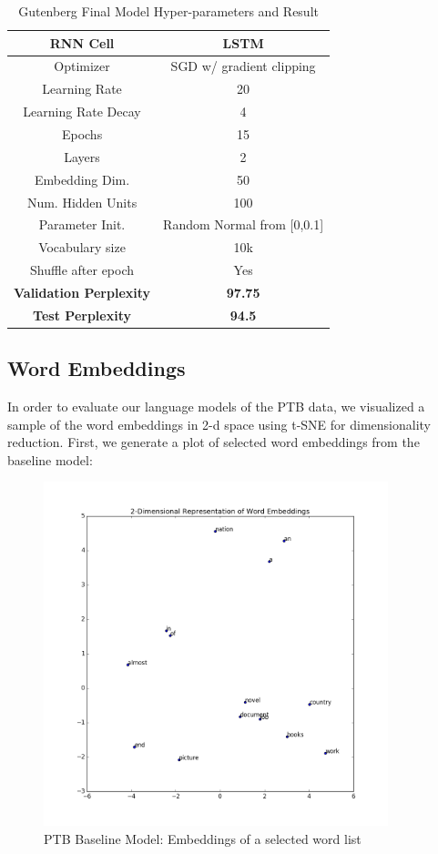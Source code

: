 \documentclass[a4paper]{article}
\begin{document}
\begin{table}[H]
\centering
\begin{tabular}{|c | c|} 
 \hline
RNN Cell & LSTM\\ \hline
Optimizer & SGD w/ gradient clipping \\ \hline
Learning Rate & 20 \\ \hline
Learning Rate Decay & 4 \\ \hline
Epochs & 15\\ \hline
Layers & 2\\ \hline
Embedding Dim. & 50\\ \hline
Num. Hidden Units & 100\\ \hline
Parameter Init. & Random Normal from [0,0.1]\\ \hline
Vocabulary size & 10k\\ \hline
Shuffle after epoch & Yes \\ \hline
\textbf{Validation Perplexity} &\textbf{97.75} \\ \hline
\textbf{Test Perplexity} &\textbf{94.5} \\ \hline
\end{tabular}
\caption{Gutenberg Final Model Hyper-parameters and Result}
\label{table:1}
\end{table}

\subsection{Word Embeddings}
In order to evaluate our language models of the PTB data, we visualized a sample of the word embeddings in 2-d space using t-SNE for dimensionality reduction. First, we generate a plot of selected word embeddings from the baseline model:

\begin{figure}[H]
  \includegraphics[width=10cm]{../plots/PTB_baseline_word_list_embeddings.png}
  \centering
  \caption{PTB Baseline Model: Embeddings of a selected word list}
  \label{fig:ptb1}
\end{figure}
\end{document}
